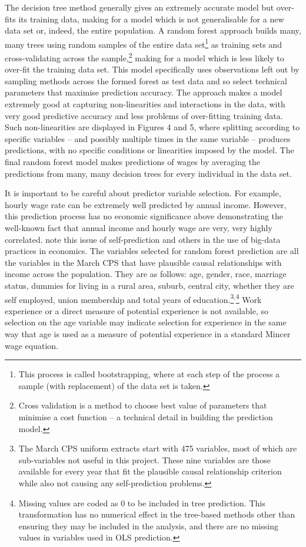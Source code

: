 \documentclass[notitlepage,12pt]{article}
\begin{document}
The decision tree method generally gives an extremely accurate model but over-fits its training data, making for a model which is not generalisable for a new data set or, indeed, the entire population.  A random forest approach builds many, many trees using random samples of the entire data set\footnote{This process is called bootstrapping, where at each step of the process a sample (with replacement) of the data set is taken.} as training sets and cross-validating across the sample,\footnote{Cross validation is a method to choose best value of parameters that minimise a cost function -- a technical detail in building the prediction model.} making for a model which is less likely to over-fit the training data set.  This model specifically uses observations left out by sampling methods across the formed forest as test data and so select technical parameters that maximise prediction accuracy.  The approach makes a model extremely good at capturing non-linearities and interactions in the data, with very good predictive accuracy and less problems of over-fitting training data.  Such non-linearities are displayed in Figures 4 and 5, where splitting according to specific variables -- and possibly multiple times in the same variable -- produces predictions, with no specific conditions or linearities imposed by the model.  The final random forest model makes predictions of wages by averaging the predictions from many, many decision trees for every individual in the data set.  

It is important to be careful about predictor variable selection.  For example, hourly wage rate can be extremely well predicted by annual income.  However, this prediction process has no economic significance above demonstrating the well-known fact that annual income and hourly wage are very, very highly correlated.  \cite{mullainathan2017machine} note this issue of self-prediction and others in the use of big-data practices in economics.  The variables selected for random forest prediction are all the variables in the March CPS that have plausible causal relationships with income across the population.  They are as follows: age, gender, race, marriage status, dummies for living in a rural area, suburb, central city, whether they are self employed, union membership and total years of education.\footnote{The March CPS uniform extracts start with 475 variables, most of which are sub-variables not useful in this project.  These nine variables are those available for every year that fit the plausible causal relationship criterion while also not causing any self-prediction problems.}$^{,}$\footnote{Missing values are coded as 0 to be included in tree prediction.  This transformation has no numerical effect in the tree-based methods other than ensuring they may be included in the analysis, and there are no missing values in variables used in OLS prediction.}  Work experience or a direct measure of potential experience is not available, so selection on the age variable may indicate selection for experience in the same way that age is used as a measure of potential experience in a standard Mincer wage equation.
\end{document}
